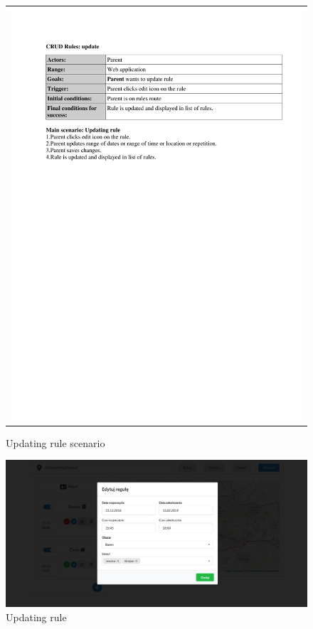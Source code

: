 \documentclass{sprawozdanie-agh}
\begin{document}
		\begin{figure}[H] 
			\centering
			\begin{tabular}{c}
				\includegraphics[width=.80\textwidth]{rulesUpdate} 
			\end{tabular} 
		\caption{Updating rule scenario}
		\end{figure}

		\begin{figure}[H]
			\centering
			\includegraphics[width=.80\textwidth]{editRule}
			\caption{Updating rule}
		\end{figure}
\end{document}
